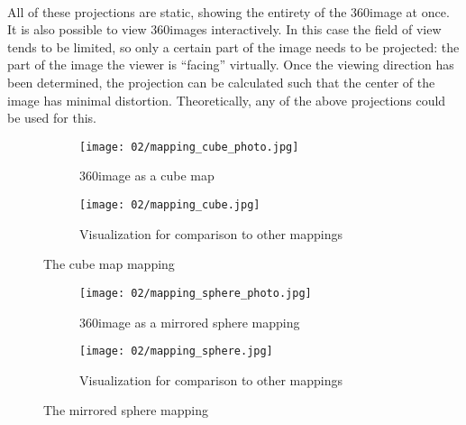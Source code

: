 \paragraph*{}
All of these projections are static, showing the entirety of the 360\degree image at once. It is also possible to view 360\degree images interactively. In this case the field of view tends to be limited, so only a certain part of the image needs to be projected: the part of the image the viewer is ``facing'' virtually. Once the viewing direction has been determined, the projection can be calculated such that the center of the image has minimal distortion. Theoretically, any of the above projections could be used for this. 

\begin{figure}
\centering
    \begin{subfigure}[t]{0.5\textwidth}            
            \centering
            \texttt{[image: 02/mapping\_cube\_photo.jpg]}
            \caption{360\degree image as a cube map}
    \end{subfigure}%
    \begin{subfigure}[t]{0.5\textwidth}
            \centering
            \texttt{[image: 02/mapping\_cube.jpg]}
            \caption{Visualization for comparison to other mappings \protect\footnotemark}
    \end{subfigure}
    \caption[Cube map mapping]{The cube map mapping}\label{fig:cubemap-intro}

    \quad
    \begin{subfigure}[t]{0.5\textwidth}
            \centering
            \texttt{[image: 02/mapping\_sphere\_photo.jpg]}
            \caption{360\degree image as a mirrored sphere mapping}
    \end{subfigure}%
    \begin{subfigure}[t]{0.5\textwidth}
            \centering
            \texttt{[image: 02/mapping\_sphere.jpg]}
            \caption{Visualization for comparison to other mappings}
    \end{subfigure}
    \caption[Mirrored sphere mapping]{The mirrored sphere mapping}\label{fig:sphere-intro}


\end{figure}
